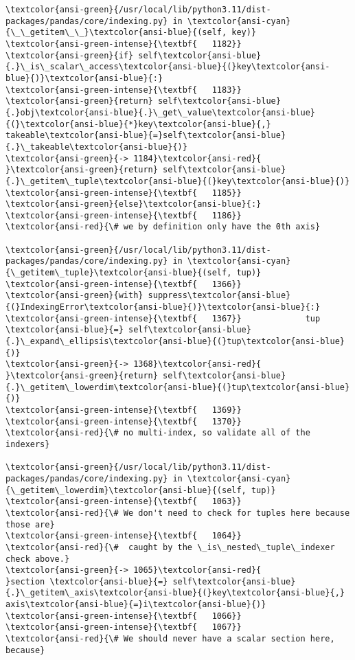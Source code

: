 \documentclass[11pt]{article}
\begin{document}
\begin{Verbatim}[commandchars=\\\{\}, frame=single, framerule=2mm, rulecolor=\color{outerrorbackground}]
\textcolor{ansi-green}{/usr/local/lib/python3.11/dist-packages/pandas/core/indexing.py} in \textcolor{ansi-cyan}{\_\_getitem\_\_}\textcolor{ansi-blue}{(self, key)}
\textcolor{ansi-green-intense}{\textbf{   1182}}             \textcolor{ansi-green}{if} self\textcolor{ansi-blue}{.}\_is\_scalar\_access\textcolor{ansi-blue}{(}key\textcolor{ansi-blue}{)}\textcolor{ansi-blue}{:}
\textcolor{ansi-green-intense}{\textbf{   1183}}                 \textcolor{ansi-green}{return} self\textcolor{ansi-blue}{.}obj\textcolor{ansi-blue}{.}\_get\_value\textcolor{ansi-blue}{(}\textcolor{ansi-blue}{*}key\textcolor{ansi-blue}{,} takeable\textcolor{ansi-blue}{=}self\textcolor{ansi-blue}{.}\_takeable\textcolor{ansi-blue}{)}
\textcolor{ansi-green}{-> 1184}\textcolor{ansi-red}{             }\textcolor{ansi-green}{return} self\textcolor{ansi-blue}{.}\_getitem\_tuple\textcolor{ansi-blue}{(}key\textcolor{ansi-blue}{)}
\textcolor{ansi-green-intense}{\textbf{   1185}}         \textcolor{ansi-green}{else}\textcolor{ansi-blue}{:}
\textcolor{ansi-green-intense}{\textbf{   1186}}             \textcolor{ansi-red}{\# we by definition only have the 0th axis}

\textcolor{ansi-green}{/usr/local/lib/python3.11/dist-packages/pandas/core/indexing.py} in \textcolor{ansi-cyan}{\_getitem\_tuple}\textcolor{ansi-blue}{(self, tup)}
\textcolor{ansi-green-intense}{\textbf{   1366}}         \textcolor{ansi-green}{with} suppress\textcolor{ansi-blue}{(}IndexingError\textcolor{ansi-blue}{)}\textcolor{ansi-blue}{:}
\textcolor{ansi-green-intense}{\textbf{   1367}}             tup \textcolor{ansi-blue}{=} self\textcolor{ansi-blue}{.}\_expand\_ellipsis\textcolor{ansi-blue}{(}tup\textcolor{ansi-blue}{)}
\textcolor{ansi-green}{-> 1368}\textcolor{ansi-red}{             }\textcolor{ansi-green}{return} self\textcolor{ansi-blue}{.}\_getitem\_lowerdim\textcolor{ansi-blue}{(}tup\textcolor{ansi-blue}{)}
\textcolor{ansi-green-intense}{\textbf{   1369}} 
\textcolor{ansi-green-intense}{\textbf{   1370}}         \textcolor{ansi-red}{\# no multi-index, so validate all of the indexers}

\textcolor{ansi-green}{/usr/local/lib/python3.11/dist-packages/pandas/core/indexing.py} in \textcolor{ansi-cyan}{\_getitem\_lowerdim}\textcolor{ansi-blue}{(self, tup)}
\textcolor{ansi-green-intense}{\textbf{   1063}}                 \textcolor{ansi-red}{\# We don't need to check for tuples here because those are}
\textcolor{ansi-green-intense}{\textbf{   1064}}                 \textcolor{ansi-red}{\#  caught by the \_is\_nested\_tuple\_indexer check above.}
\textcolor{ansi-green}{-> 1065}\textcolor{ansi-red}{                 }section \textcolor{ansi-blue}{=} self\textcolor{ansi-blue}{.}\_getitem\_axis\textcolor{ansi-blue}{(}key\textcolor{ansi-blue}{,} axis\textcolor{ansi-blue}{=}i\textcolor{ansi-blue}{)}
\textcolor{ansi-green-intense}{\textbf{   1066}} 
\textcolor{ansi-green-intense}{\textbf{   1067}}                 \textcolor{ansi-red}{\# We should never have a scalar section here, because}


\end{Verbatim}
\end{document}
